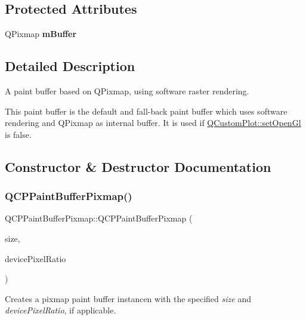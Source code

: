 \subsection*{Protected Attributes}
\begin{DoxyCompactItemize}
\item 
\mbox{\label{class_q_c_p_paint_buffer_pixmap_a6d7009f45f03e305f2dc00e52a9225f8}} 
Q\+Pixmap {\bfseries m\+Buffer}
\end{DoxyCompactItemize}


\subsection{Detailed Description}
A paint buffer based on Q\+Pixmap, using software raster rendering. 

This paint buffer is the default and fall-\/back paint buffer which uses software rendering and Q\+Pixmap as internal buffer. It is used if \hyperlink{class_q_custom_plot_a7db1adc09016329f3aef7c60da935789}{Q\+Custom\+Plot\+::set\+Open\+Gl} is false. 

\subsection{Constructor \& Destructor Documentation}
\mbox{\label{class_q_c_p_paint_buffer_pixmap_aef0224e03b9285509391fcd61a8e6844}} 
\subsubsection{\texorpdfstring{Q\+C\+P\+Paint\+Buffer\+Pixmap()}{QCPPaintBufferPixmap()}}
{\footnotesize\ttfamily Q\+C\+P\+Paint\+Buffer\+Pixmap\+::\+Q\+C\+P\+Paint\+Buffer\+Pixmap (\begin{DoxyParamCaption}\item[{const Q\+Size \&}]{size,  }\item[{double}]{device\+Pixel\+Ratio }\end{DoxyParamCaption})\hspace{0.3cm}{\ttfamily [explicit]}}

Creates a pixmap paint buffer instancen with the specified {\itshape size} and {\itshape device\+Pixel\+Ratio}, if applicable. 

